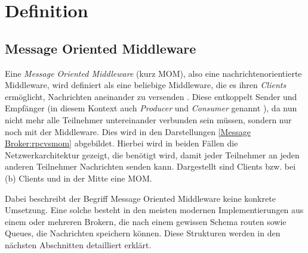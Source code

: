 \section{Definition}
\label{definition:definition}
\subsection{Message Oriented Middleware}
Eine \textit{Message Oriented Middleware} (kurz MOM), also eine
nachrichtenorientierte Middleware, wird definiert als eine beliebige Middleware,
die es ihren \textit{Clients} ermöglicht, Nachrichten aneinander zu versenden \cite{tanenbaum2007distributed}.
Diese entkoppelt Sender und Empfänger (in diesem Kontext auch
\textit{Producer} und \textit{Consumer} genannt \cite{eugster2003many}), da nun nicht
mehr alle Teilnehmer untereinander verbunden sein müssen, sondern nur noch mit
der Middleware.
Dies wird in den Darstellungen \ref{Message Broker:rpcvsmom} abgebildet.
Hierbei wird in beiden Fällen die Netzwerkarchitektur gezeigt, die benötigt wird,
damit jeder Teilnehmer an jeden anderen Teilnehmer Nachrichten senden kann.
Dargestellt sind Clients bzw. bei (b) Clients und in der Mitte eine MOM.

Dabei beschreibt der Begriff Message Oriented Middleware keine konkrete Umsetzung.
Eine solche besteht in den meisten modernen Implementierungen aus einem oder
mehreren Brokern, die nach einem gewissen Schema routen sowie Queues, die
Nachrichten speichern können. Diese Strukturen werden in den nächsten Abschnitten
detailliert erklärt. \cite{curry2004message}

